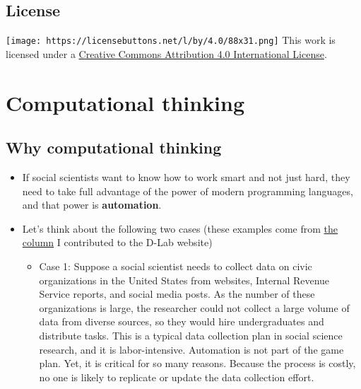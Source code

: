 \documentclass[
]{book}
\providecommand{\tightlist}{%
  \setlength{\itemsep}{0pt}\setlength{\parskip}{0pt}}
\begin{document}
\hypertarget{license}{%
\section{License}\label{license}}

\texttt{[image: https://licensebuttons.net/l/by/4.0/88x31.png]} This work is licensed under a \href{https://creativecommons.org/licenses/by/4.0/}{Creative Commons Attribution 4.0 International License}.

\hypertarget{motivation}{%
\chapter{Computational thinking}\label{motivation}}

\hypertarget{why-computational-thinking}{%
\section{Why computational thinking}\label{why-computational-thinking}}

\begin{itemize}
\item
  If social scientists want to know how to work smart and not just hard, they need to take full advantage of the power of modern programming languages, and that power is \textbf{automation}.
\item
  Let's think about the following two cases (these examples come from \href{https://dlab.berkeley.edu/blog/why-teaching-social-scientists-how-code-professional-important}{the column} I contributed to the D-Lab website)

  \begin{itemize}
  \tightlist
  \item
    Case 1: Suppose a social scientist needs to collect data on civic organizations in the United States from websites, Internal Revenue Service reports, and social media posts. As the number of these organizations is large, the researcher could not collect a large volume of data from diverse sources, so they would hire undergraduates and distribute tasks. This is a typical data collection plan in social science research, and it is labor-intensive. Automation is not part of the game plan. Yet, it is critical for so many reasons. Because the process is costly, no one is likely to replicate or update the data collection effort.
  \end{itemize}
\end{itemize}
\end{document}
